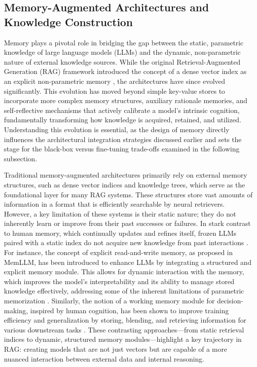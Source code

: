 \documentclass[11pt]{article}
\begin{document}
\subsection{Memory-Augmented Architectures and Knowledge Construction}

Memory plays a pivotal role in bridging the gap between the static, parametric knowledge of large language models (LLMs) and the dynamic, non-parametric nature of external knowledge sources. While the original Retrieval-Augmented Generation (RAG) framework introduced the concept of a dense vector index as an explicit non-parametric memory \cite{ref22}, the architectures have since evolved significantly. This evolution has moved beyond simple key-value stores to incorporate more complex memory structures, auxiliary rationale memories, and self-reflective mechanisms that actively calibrate a model's intrinsic cognition, fundamentally transforming how knowledge is acquired, retained, and utilized. Understanding this evolution is essential, as the design of memory directly influences the architectural integration strategies discussed earlier and sets the stage for the black-box versus fine-tuning trade-offs examined in the following subsection.

Traditional memory-augmented architectures primarily rely on external memory structures, such as dense vector indices and knowledge trees, which serve as the foundational layer for many RAG systems. These structures store vast amounts of information in a format that is efficiently searchable by neural retrievers. However, a key limitation of these systems is their static nature; they do not inherently learn or improve from their past successes or failures. In stark contrast to human memory, which continually updates and refines itself, frozen LLMs paired with a static index do not acquire new knowledge from past interactions \cite{ref59}. For instance, the concept of explicit read-and-write memory, as proposed in MemLLM, has been introduced to enhance LLMs by integrating a structured and explicit memory module. This allows for dynamic interaction with the memory, which improves the model's interpretability and its ability to manage stored knowledge effectively, addressing some of the inherent limitations of parametric memorization \cite{ref33}. Similarly, the notion of a working memory module for decision-making, inspired by human cognition, has been shown to improve training efficiency and generalization by storing, blending, and retrieving information for various downstream tasks \cite{ref60}. These contrasting approaches---from static retrieval indices to dynamic, structured memory modules---highlight a key trajectory in RAG: creating models that are not just vectors \cite{ref61} but are capable of a more nuanced interaction between external data and internal reasoning.
\end{document}
